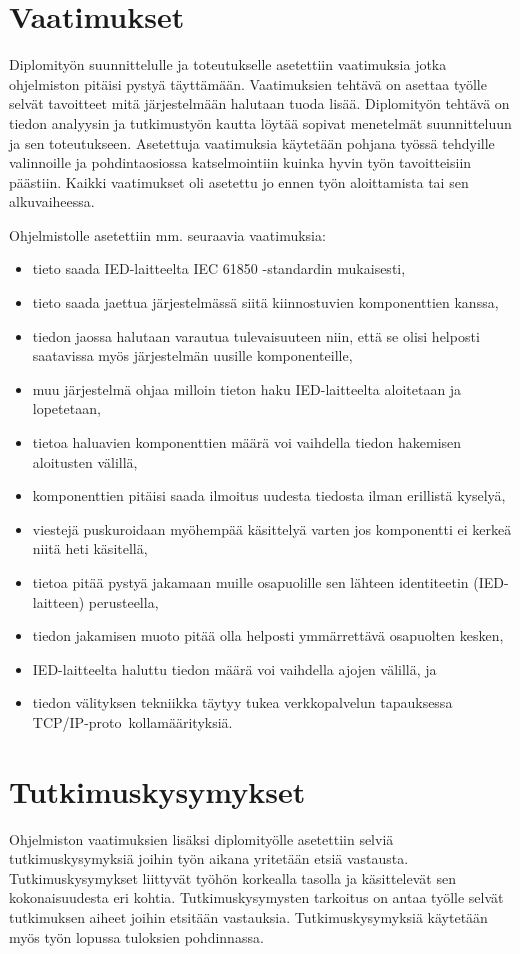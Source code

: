 \section{Vaatimukset}
\label{ch:vaatimukset}
Diplomityön suunnittelulle ja toteutukselle asetettiin vaatimuksia jotka ohjelmiston pitäisi pystyä täyttämään. Vaatimuksien tehtävä on asettaa työlle selvät tavoitteet mitä järjestelmään halutaan tuoda lisää. Diplomityön tehtävä on tiedon analyysin ja tutkimustyön kautta löytää sopivat menetelmät suunnitteluun ja sen toteutukseen. Asetettuja vaatimuksia käytetään pohjana työssä tehdyille valinnoille ja pohdintaosiossa katselmointiin kuinka hyvin työn tavoitteisiin päästiin. Kaikki vaatimukset oli asetettu jo ennen työn aloittamista tai sen alkuvaiheessa.

Ohjelmistolle asetettiin mm. seuraavia vaatimuksia:
\begin{itemize}
	\item tieto saada IED-laitteelta IEC 61850 -standardin mukaisesti,
	\item tieto saada jaettua järjestelmässä siitä kiinnostuvien komponenttien kanssa,
	\item tiedon jaossa halutaan varautua tulevaisuuteen niin, että se olisi helposti saatavissa myös järjestelmän uusille komponenteille,
	\item muu järjestelmä ohjaa milloin tieton haku IED-laitteelta aloitetaan ja lopetetaan,
	\item tietoa haluavien komponenttien määrä voi vaihdella tiedon hakemisen aloitusten välillä,	
	\item komponenttien pitäisi saada ilmoitus uudesta tiedosta ilman erillistä kyselyä,
	\item viestejä puskuroidaan myöhempää käsittelyä varten jos komponentti ei kerkeä niitä heti käsitellä,
	\item tietoa pitää pystyä jakamaan muille osapuolille sen lähteen identiteetin (IED-laitteen) perusteella,
	\item tiedon jakamisen muoto pitää olla helposti ymmärrettävä osapuolten kesken,
	\item IED-laitteelta haluttu tiedon määrä voi vaihdella ajojen välillä, ja
	\item tiedon välityksen tekniikka täytyy tukea verkkopalvelun tapauksessa TCP/IP-pro\-to \-kol\-la\-mää\-ri\-tyk\-si\-ä.
\end{itemize}


\section{Tutkimuskysymykset}
Ohjelmiston vaatimuksien lisäksi diplomityölle asetettiin selviä tutkimuskysymyksiä joihin työn aikana yritetään etsiä vastausta. Tutkimuskysymykset liittyvät työhön korkealla tasolla ja käsittelevät sen kokonaisuudesta eri kohtia. Tutkimuskysymysten tarkoitus on antaa työlle selvät tutkimuksen aiheet joihin etsitään vastauksia. Tutkimuskysymyksiä käytetään myös työn lopussa tuloksien pohdinnassa.

